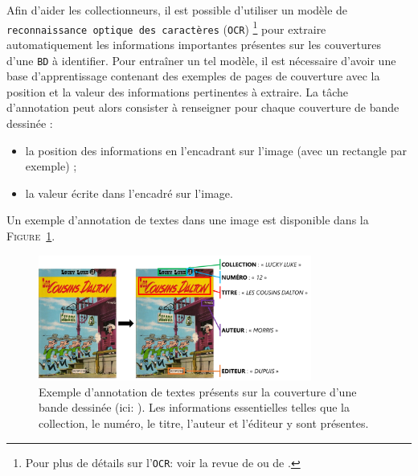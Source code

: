 			Afin d'aider les collectionneurs, il est possible d'utiliser un modèle de \texttt{reconnaissance optique des caractères} (\texttt{OCR}) \footnote{
				Pour plus de détails sur l'\texttt{OCR}: voir la revue de \cite{berchmans-kumar:2014:optical-character-recognition} ou de \cite{awel-abidi:2019:review-optical-character}.
			} pour extraire automatiquement les informations importantes présentes sur les couvertures d'une \texttt{BD} à identifier.
			Pour entraîner un tel modèle, il est nécessaire d'avoir une base d'apprentissage contenant des exemples de pages de couverture avec la position et la valeur des informations pertinentes à extraire.
			La tâche d'annotation peut alors consister à renseigner pour chaque couverture de bande dessinée :
			\begin{itemize}
				\item la position des informations en l'encadrant sur l'image (avec un rectangle par exemple) ;
				\item la valeur écrite dans l'encadré sur l'image.
			\end{itemize}
			
			Un exemple d'annotation de textes dans une image est disponible dans la \textsc{Figure~\ref{figure:2.1.2.C-PRESENTATION-ANNOTATION-EXEMPLES-EXTRACTION}}.
			\begin{leftBarExamples}
				\begin{figure}[H]
					\centering
					\includegraphics[width=0.80\textwidth]{figures/etatdelart-morris-1958-lucky-luke-12}
					\caption{
						Exemple d'annotation de textes présents sur la couverture d'une bande dessinée (ici: \cite{morris-goscinny:1958:cousins-dalton}).
						Les informations essentielles telles que la collection, le numéro, le titre, l'auteur et l'éditeur y sont présentes. 
					}
					\label{figure:2.1.2.C-PRESENTATION-ANNOTATION-EXEMPLES-EXTRACTION}
				\end{figure}
			\end{leftBarExamples}
			

